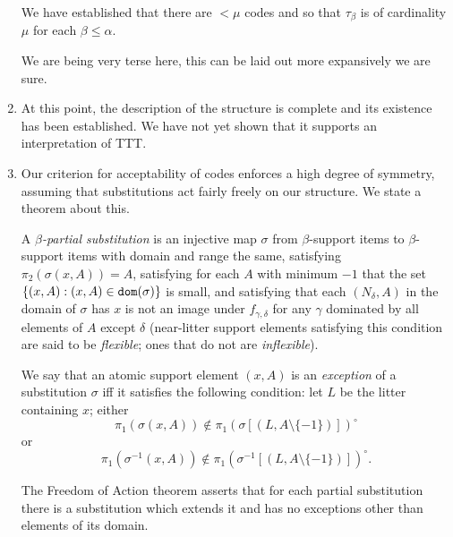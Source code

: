 \documentclass[12pt]{article}
\begin{document}
\begin{enumerate}
We have established that there are $<\mu$ codes and so that $\tau_{\beta}$ is of cardinality $\mu$ for each $\beta\leq \alpha$.

We are being very terse here, this can be laid out more expansively we are sure.

\item  At this point, the description of the structure is complete and its existence has been established.  We have not yet shown that it supports an interpretation of TTT.

\item Our criterion for acceptability of codes enforces a high degree of symmetry, assuming that substitutions act fairly freely on our structure.  We state a theorem about this.

A {\em $\beta$-partial substitution\/} is an injective map $\sigma$ from $\beta$-support items to $\beta$-support items with domain and range the same, satisfying $\pi_2(\sigma(x,A)) = A$, satisfying for each $A$ with minimum $-1$ that the set $\{(x,A): (x,A) \in {\tt dom}(\sigma)\}$ is small, and satisfying that each $(N_\delta,A)$
in the domain of $\sigma$ has $x$ is not an image under $f_{\gamma,\delta}$ for any $\gamma$ dominated by all elements of $A$ except $\delta$ (near-litter support elements satisfying this condition are said to be {\em flexible\/}; ones that do not are {\em inflexible}).

 We say that an atomic support element $(x,A)$ is an {\em exception\/} of a substitution $\sigma$ iff it satisfies the following condition:
let $L$ be the litter containing $x$; either $$\pi_1(\sigma(x,A)) \not\in \pi_1(\sigma[(L,A \setminus \{-1\})])^\circ$$ or $$\pi_1(\sigma^{-1}(x,A)) \not\in \pi_1(\sigma^{-1}[(L,A \setminus \{-1\})])^\circ.$$

The Freedom of Action theorem asserts that for each partial substitution there is a substitution which extends it and has no exceptions other than elements of its domain.



\end{enumerate}
\end{document}
